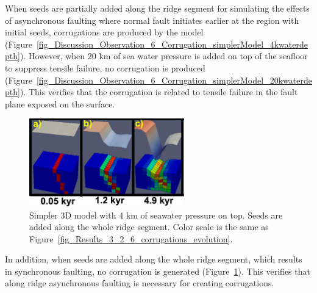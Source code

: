 When seeds are partially added along the ridge segment for simulating the effects of asynchronous faulting where normal fault initiates earlier at the region with initial seeds, corrugations are produced by the model (Figure~\hyperref[fig_Discussion_Observation_6_Corrugation_simplerModel_4kwaterdepth]{\ref{fig_Discussion_Observation_6_Corrugation_simplerModel_4kwaterdepth}}). 
However, when 20 km of sea water pressure is added on top of the seafloor to suppress tensile failure, no corrugation is produced (Figure~\hyperref[fig_Discussion_Observation_6_Corrugation_simplerModel_20kwaterdepth]{\ref{fig_Discussion_Observation_6_Corrugation_simplerModel_20kwaterdepth}}). This verifies that the corrugation is related to tensile failure in the fault plane exposed on the surface.

\begin{figure}[h]
  \centering
    \includegraphics[width=0.6\textwidth]{./Figures/fig_Discussion_Observation_6_Corrugation_simplerModel_4kwaterdepth_along_ridge_seed.eps}
  \caption[Simpler 3D model with 4 km of seawater pressure on top. Seeds are added along the whole ridge segment.]{Simpler 3D model with 4 km of seawater pressure on top. Seeds are added along the whole ridge segment. Color scale is the same as Figure~\hyperref[fig_Results_3_2_6_corrugations_evolution]{\ref{fig_Results_3_2_6_corrugations_evolution}}.}
 \label{fig_Discussion_Observation_6_Corrugation_simplerModel_4kwaterdepth_along_ridge_seed}
\end{figure}   

In addition, when seeds are added along the whole ridge segment, which results in synchronous faulting, no corrugation is generated (Figure~\hyperref[fig_Discussion_Observation_6_Corrugation_simplerModel_4kwaterdepth_along_ridge_seed]{\ref{fig_Discussion_Observation_6_Corrugation_simplerModel_4kwaterdepth_along_ridge_seed}}). This verifies that along ridge asynchronous faulting is necessary for creating corrugations.

